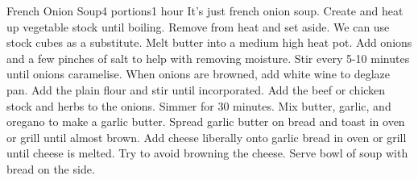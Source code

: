 \begin{recipe}[FrenchOnionSoup]{French Onion Soup}{4 portions}{1 hour}
    \freeform It's just french onion soup.
    Create and heat up vegetable stock until boiling. Remove from heat and set aside. We can use stock cubes as a substitute.
    Melt butter into a medium high heat pot. Add onions and a few pinches of salt to help with removing moisture. Stir every 5-10 minutes until onions caramelise.
    When onions are browned, add white wine to deglaze pan. Add the plain flour and stir until incorporated.
    Add the beef or chicken stock and herbs to the onions. Simmer for 30 minutes.
    Mix butter, garlic, and oregano to make a garlic butter. Spread garlic butter on bread and toast in oven or grill until almost brown.
    Add cheese liberally onto garlic bread in oven or grill until cheese is melted. Try to avoid browning the cheese.
    \newstep
    Serve bowl of soup with bread on the side.
    \freeform\hrulefill
\end{recipe}